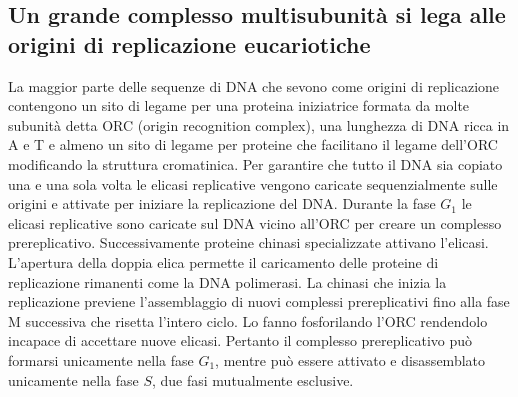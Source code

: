 \subsection{Un grande complesso multisubunit\`a si lega alle origini di replicazione eucariotiche}
La maggior parte delle sequenze di DNA che sevono come origini di replicazione contengono un sito di legame per una proteina iniziatrice formata da molte subunit\`a detta ORC (origin
recognition complex), una lunghezza di DNA ricca in A e T e almeno un sito di legame per proteine che facilitano il legame dell'ORC modificando la struttura cromatinica. Per garantire
che tutto il DNA sia copiato una e una sola volta le elicasi replicative vengono caricate sequenzialmente sulle origini e attivate per iniziare la replicazione del DNA. Durante la fase
$G_1$ le elicasi replicative sono caricate sul DNA vicino all'ORC per creare un complesso prereplicativo. Successivamente proteine chinasi specializzate attivano l'elicasi. L'apertura
della doppia elica permette il caricamento delle proteine di replicazione rimanenti come la DNA polimerasi. La chinasi che inizia la replicazione previene l'assemblaggio di nuovi 
complessi prereplicativi fino alla fase M successiva che risetta l'intero ciclo. Lo fanno fosforilando l'ORC rendendolo incapace di accettare nuove elicasi. Pertanto il complesso 
prereplicativo pu\`o formarsi unicamente nella fase $G_1$, mentre pu\`o essere attivato e disassemblato unicamente nella fase $S$, due fasi mutualmente esclusive. 
